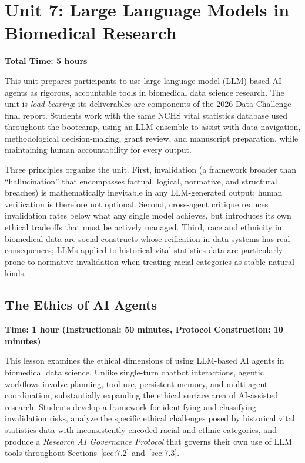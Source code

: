 \chapter{Unit 7: Large Language Models in Biomedical Research}
\label{chap:unit7}

\textbf{Total Time: 5 hours}

This unit prepares participants to use large language model (LLM)
based AI agents as rigorous, accountable tools in biomedical data
science research. The unit is \emph{load-bearing}: its deliverables
are components of the 2026 Data Challenge final report. Students
work with the same NCHS vital statistics database used throughout
the bootcamp, using an LLM ensemble to assist with data navigation,
methodological decision-making, grant review, and manuscript
preparation, while maintaining human accountability for every output.

Three principles organize the unit. First, invalidation
(a framework broader than ``hallucination'' that encompasses
factual, logical, normative, and structural breaches) is
mathematically inevitable in any LLM-generated output; human
verification is therefore not optional. Second, cross-agent
critique reduces invalidation rates below what any single model
achieves, but introduces its own ethical tradeoffs that must be
actively managed. Third, race and ethnicity in biomedical data are
social constructs whose reification in data systems has real
consequences; LLMs applied to historical vital statistics data are
particularly prone to normative invalidation when treating racial
categories as stable natural kinds.

\section{The Ethics of AI Agents}
\label{sec:7.1}

\textbf{Time: 1 hour (Instructional: 50 minutes, Protocol Construction: 10 minutes)}

This lesson examines the ethical dimensions of using LLM-based AI
agents in biomedical data science. Unlike single-turn chatbot
interactions, agentic workflows involve planning, tool use,
persistent memory, and multi-agent coordination, substantially
expanding the ethical surface area of AI-assisted research.
Students develop a framework for identifying and classifying
invalidation risks, analyze the specific ethical challenges posed
by historical vital statistics data with inconsistently encoded
racial and ethnic categories, and produce a \emph{Research AI
Governance Protocol} that governs their own use of LLM tools
throughout Sections~\ref{sec:7.2} and~\ref{sec:7.3}.

